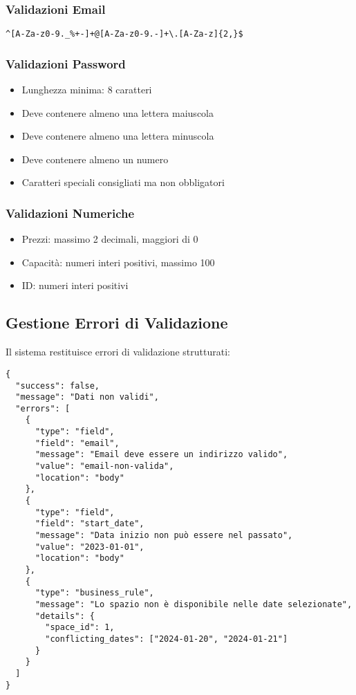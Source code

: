\subsubsection{Validazioni Email}
\begin{lstlisting}[caption=Regex Validazione Email]
^[A-Za-z0-9._%+-]+@[A-Za-z0-9.-]+\.[A-Za-z]{2,}$
\end{lstlisting}

\subsubsection{Validazioni Password}
\begin{itemize}
    \item Lunghezza minima: 8 caratteri
    \item Deve contenere almeno una lettera maiuscola
    \item Deve contenere almeno una lettera minuscola  
    \item Deve contenere almeno un numero
    \item Caratteri speciali consigliati ma non obbligatori
\end{itemize}

\subsubsection{Validazioni Numeriche}
\begin{itemize}
    \item Prezzi: massimo 2 decimali, maggiori di 0
    \item Capacità: numeri interi positivi, massimo 100
    \item ID: numeri interi positivi
\end{itemize}

\subsection{Gestione Errori di Validazione}
Il sistema restituisce errori di validazione strutturati:

\begin{lstlisting}[caption=Esempio Errore Validazione Multipla]
{
  "success": false,
  "message": "Dati non validi",
  "errors": [
    {
      "type": "field",
      "field": "email",
      "message": "Email deve essere un indirizzo valido",
      "value": "email-non-valida",
      "location": "body"
    },
    {
      "type": "field",
      "field": "start_date", 
      "message": "Data inizio non può essere nel passato",
      "value": "2023-01-01",
      "location": "body"
    },
    {
      "type": "business_rule",
      "message": "Lo spazio non è disponibile nelle date selezionate",
      "details": {
        "space_id": 1,
        "conflicting_dates": ["2024-01-20", "2024-01-21"]
      }
    }
  ]
}
\end{lstlisting}